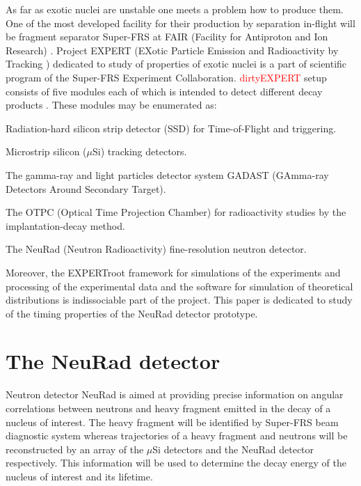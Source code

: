 \documentclass{webofc}
\newcommand{\red}[1]{\textcolor{red}{#1}}
\begin{document}
As far as exotic nuclei are unstable one meets a problem how to produce them.
One of the most developed facility for their production by separation in-flight will be fragment separator Super-FRS at FAIR (Facility for Antiproton and Ion Research) \cite{diplom}. Project EXPERT (EXotic Particle Emission and Radioactivity by Tracking \cite{IMexpert}) dedicated to study of properties of exotic nuclei is a part of scientific program of the Super-FRS Experiment Collaboration. \red{dirtyEXPERT} setup consists of five modules each of which is intended to detect different decay products \cite{tdr}.
These modules may be enumerated as:
\begin{inparaenum}[(i)]
	\item Radiation-hard silicon strip detector (SSD) for Time-of-Flight and triggering.
	\item Microstrip silicon ($\mu$Si) tracking detectors.
	\item The gamma-ray and light particles detector system GADAST (GAmma-ray Detectors Around Secondary Target).
	\item The OTPC (Optical Time Projection Chamber) for radioactivity studies by the implantation-decay method.
	\item The NeuRad (Neutron Radioactivity) fine-resolution neutron detector.
\end{inparaenum}

Moreover, the EXPERTroot framework \cite{er} for simulations of the experiments and processing of the experimental data and the software for simulation of theoretical distributions is indissociable part of the project.
This paper is dedicated to study of the timing properties of the NeuRad detector prototype.

\section{The NeuRad detector}

Neutron detector NeuRad is aimed at providing precise information on angular correlations between neutrons and heavy fragment emitted in the decay of a nucleus of interest. The heavy fragment will be identified by Super-FRS beam diagnostic system whereas trajectories of a heavy fragment and neutrons will be reconstructed by an array of the $\mu$Si detectors and the NeuRad detector respectively. 
This information will be used to determine the decay energy of the nucleus of interest and its lifetime.
\end{document}
